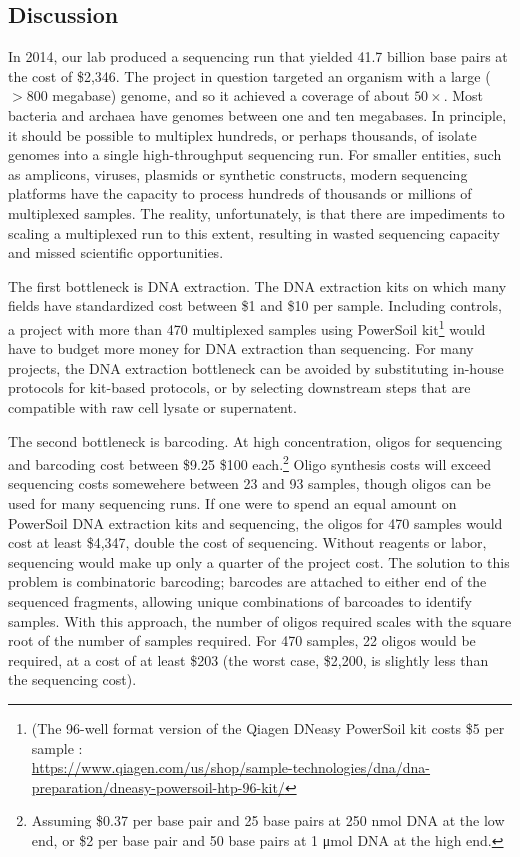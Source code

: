 \begin{refsection}
\section{Discussion}

In 2014, our lab produced a sequencing run that yielded 41.7 billion base pairs at the cost of \$2,346. The project in question targeted an organism with a large ($>800$ megabase) genome, and so it achieved a coverage of about $50\times$. Most bacteria and archaea have genomes between one and ten megabases. In principle, it should be possible to multiplex hundreds, or perhaps thousands, of isolate genomes into a single high-throughput sequencing run. For smaller entities, such as amplicons, viruses, plasmids or synthetic constructs, modern sequencing platforms have the capacity to process hundreds of thousands or millions of multiplexed samples. The reality, unfortunately, is that there are impediments to scaling a multiplexed run to this extent, resulting in wasted sequencing capacity and missed scientific opportunities.

The first bottleneck is DNA extraction. The DNA extraction kits on which many fields have standardized cost between \$1 and \$10 per sample. Including controls, a project with more than 470 multiplexed samples using PowerSoil kit\footnote{(The 96-well format version of the Qiagen DNeasy PowerSoil kit costs \$5 per sample :\\ \url{https://www.qiagen.com/us/shop/sample-technologies/dna/dna-preparation/dneasy-powersoil-htp-96-kit/}} would have to budget more money for DNA extraction than sequencing. For many projects, the DNA extraction bottleneck can be avoided by substituting in-house protocols for kit-based protocols, or by selecting downstream steps that are compatible with raw cell lysate or supernatent.

The second bottleneck is barcoding. At high concentration, oligos for sequencing and barcoding cost between \$9.25 \$100 each.\footnote{Assuming \$0.37 per base pair and 25 base pairs at 250 \si{\nano\mole} DNA at the low end, or \$2 per base pair and 50 base pairs at 1 \si{\micro\mole} DNA at the high end.} Oligo synthesis costs will exceed sequencing costs somewehere between 23 and 93 samples, though oligos can be used for many sequencing runs. If one were to spend an equal amount on PowerSoil DNA extraction kits and sequencing, the oligos for 470 samples would cost at least \$4,347, double the cost of sequencing. Without reagents or labor, sequencing would make up only a quarter of the project cost. The solution to this problem is combinatoric barcoding; barcodes are attached to either end of the sequenced fragments, allowing unique combinations of barcoades to identify samples. With this approach, the number of oligos required scales with the square root of the number of samples required. For 470 samples, 22 oligos would be required, at a cost of at least \$203 (the worst case, \$2,200, is slightly less than the sequencing cost).


\end{refsection}
